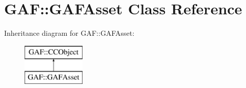 \hypertarget{class_g_a_f_1_1_g_a_f_asset}{\section{G\-A\-F\-:\-:G\-A\-F\-Asset Class Reference}
\label{class_g_a_f_1_1_g_a_f_asset}
}
Inheritance diagram for G\-A\-F\-:\-:G\-A\-F\-Asset\-:\begin{figure}[H]
\begin{center}
\leavevmode
\includegraphics[height=2.000000cm]{class_g_a_f_1_1_g_a_f_asset}
\end{center}
\end{figure}
